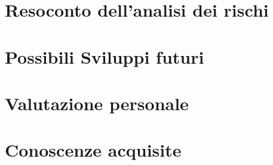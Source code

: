 


\section{Resoconto dell'analisi dei rischi}

\section{Possibili Sviluppi futuri}

\section{Valutazione personale}

\section{Conoscenze acquisite}
